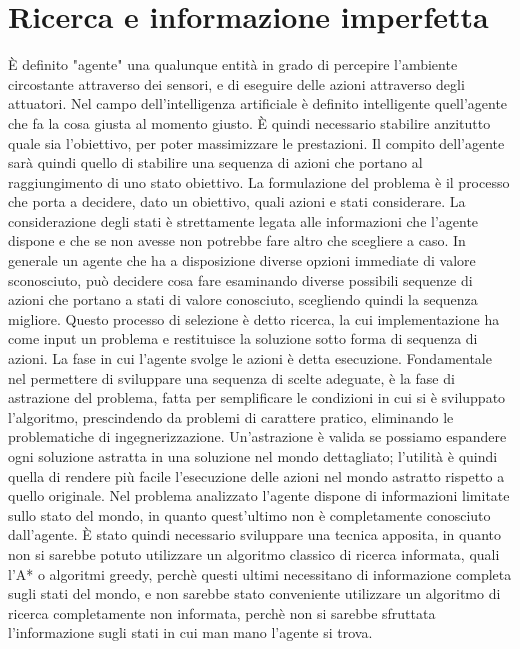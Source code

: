 \section{Ricerca e informazione imperfetta}
È definito "agente" una qualunque entità in grado di percepire l'ambiente circostante attraverso dei sensori, e di eseguire delle azioni attraverso degli attuatori. Nel campo dell'intelligenza artificiale è definito intelligente quell'agente che fa la cosa giusta al momento giusto. È quindi necessario stabilire anzitutto quale sia l'obiettivo, per poter massimizzare le prestazioni. Il compito dell'agente sarà quindi quello di stabilire una sequenza di azioni che portano al raggiungimento di uno stato obiettivo. 
La formulazione del problema è il processo che porta a decidere, dato un obiettivo, quali azioni e stati considerare. La considerazione degli stati è strettamente legata alle informazioni che l'agente dispone e che se non avesse non potrebbe fare altro che scegliere a caso. In generale un agente che ha a disposizione diverse opzioni immediate di valore sconosciuto, può decidere cosa fare esaminando diverse possibili sequenze di azioni che portano a stati di valore conosciuto, scegliendo quindi la sequenza migliore. Questo processo di selezione è detto ricerca, la cui implementazione ha come input un problema e restituisce la soluzione sotto forma di sequenza di azioni. La fase in cui l'agente svolge le azioni è detta esecuzione.
Fondamentale nel permettere di sviluppare una sequenza di scelte adeguate, è la fase di astrazione del problema, fatta per semplificare le condizioni in cui si è sviluppato l'algoritmo, prescindendo da problemi di carattere pratico, eliminando le problematiche di ingegnerizzazione. Un'astrazione è valida se possiamo espandere ogni soluzione astratta in una soluzione nel mondo dettagliato; l'utilità è quindi quella di rendere più facile l'esecuzione delle azioni nel mondo astratto rispetto a quello originale. 
Nel problema analizzato l'agente dispone di informazioni limitate sullo stato del mondo, in quanto quest'ultimo non è completamente conosciuto dall'agente. È stato quindi necessario sviluppare una tecnica apposita, in quanto non si sarebbe potuto utilizzare un algoritmo classico di ricerca informata, quali l'A* o algoritmi greedy, perchè questi ultimi necessitano di informazione completa sugli stati del mondo, e non sarebbe stato conveniente utilizzare un algoritmo di ricerca completamente non informata, perchè non si sarebbe sfruttata l'informazione sugli stati in cui man mano l'agente si trova.


